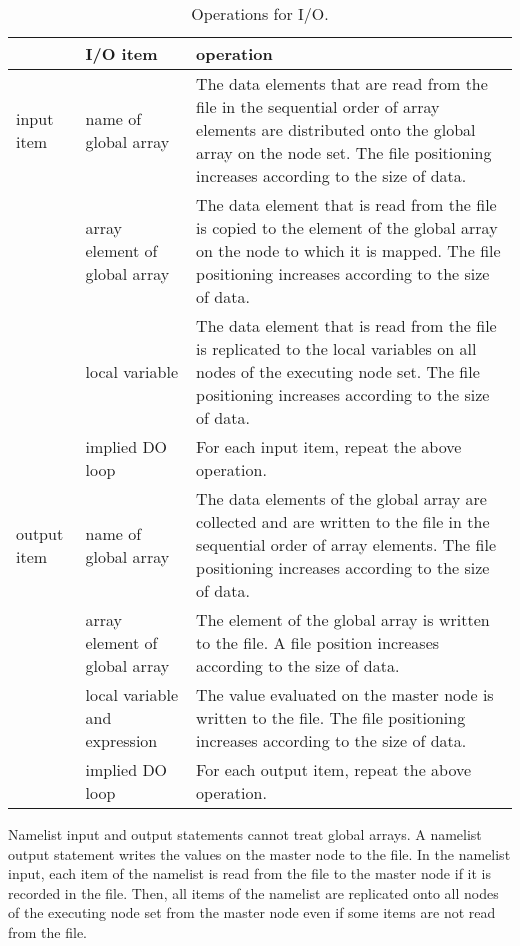    \begin{table}[h]
    \begin{center}
    \caption{Operations for I/O.}
    \label{tb:opforio}
     \begin{tabular}{|l|p{40mm}|p{80mm}|}
      \hline
      \multicolumn{1}{|c}{ }  & {\bf I/O item} & {\bf operation} \\
      \hline
      input item & name of global array & The data elements that are read 
	      from the file in the sequential order of array elements are distributed onto 
	      the global array on the node set. The file positioning
			   increases according to the size of data. \\
      \cline{2-3}
      & array element of global array & The data element that is read from the file
	      is copied to the element of the global array on the node to which it is mapped.
	      The file positioning increases according to the size of data. \\
      \cline{2-3}
      & local variable & The data element that is read from the file is replicated to the
	      local variables on all nodes of the executing node
	      set. The file positioning increases according to the size of data. \\
      \cline{2-3}
      & implied DO loop & For each input item, repeat the above operation. \\
      \hline
      output item & name of global array & The data elements of the
	      global array are collected and are written to the
	      file in the sequential order of array elements. The file
	      positioning increases according to the size of data. \\
      \cline{2-3}
      & array element of global array & The element of the global array
			   is written to the file. A file position increases
			   according to the size of data. \\
      \cline{2-3}
      & local variable and expression & The value evaluated on the master node
	      is written to the file. The file positioning increases
			   according to the size of data. \\
      \cline{2-3}
      & implied DO loop & For each output item, repeat the above operation. \\
      \hline
      \end{tabular}
     \end{center}
   \end{table}

   Namelist input and output statements cannot treat global arrays.
   A namelist output statement writes the values on the master node to
   the file.
   In the namelist input, each item of the namelist is read from the
   file to the master node if it is recorded in the file.
   Then, all items of the namelist are replicated onto all nodes of
   the executing node set from the master node even if some items are not read from the file.

